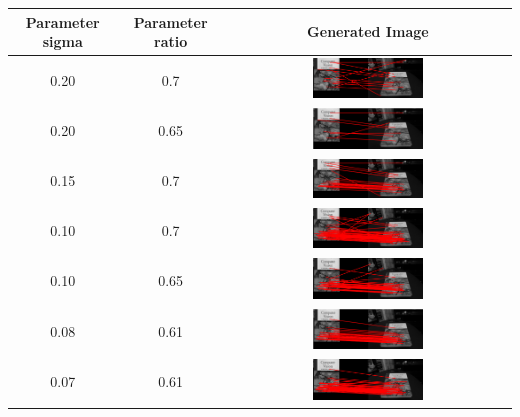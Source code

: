 \documentclass{article}
\begin{document}
	\begin{table}[H]
		\centering
		\begin{tabular}{|c|c|c|}
			\hline
			\textbf{Parameter sigma} & \textbf{Parameter ratio} & \textbf{Generated Image} \\
			\hline
			0.20 & 0.7 & \includegraphics[width=0.4\textwidth]{Q2_1_4_0.20_0.7.png} \\
			\hline
			0.20 & 0.65 & \includegraphics[width=0.4\textwidth]{Q2_1_4_0.20_0.65.png} \\						
			\hline
			0.15 & 0.7 & \includegraphics[width=0.4\textwidth]{Q2_1_4_0.15_0.7.png} \\
			\hline
			0.10 & 0.7 & \includegraphics[width=0.4\textwidth]{Q2_1_4_0.10_0.7.png} \\			
			\hline
			0.10 & 0.65 & \includegraphics[width=0.4\textwidth]{Q2_1_4_0.10_0.65.png} \\
			\hline
			0.08 & 0.61 & \includegraphics[width=0.4\textwidth]{Q2_1_4_best_output.png} \\
			\hline
			0.07 & 0.61 & \includegraphics[width=0.4\textwidth]{Q2_1_4_0.07_0.61.png} \\

\end{tabular}
\end{table}
\end{document}
